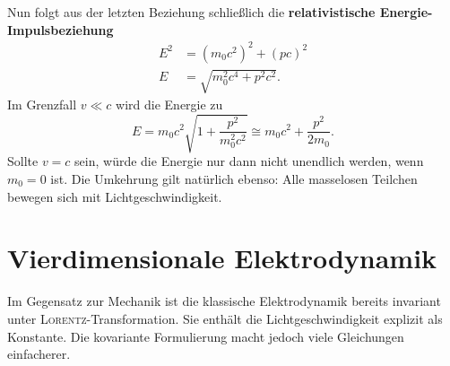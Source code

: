 Nun folgt aus der letzten Beziehung schließlich die \textbf{relativistische Energie-Impulsbeziehung}
\begin{align*}
E^2 &= \left(m_0c^2\right)^2 + \left(p c\right)^2\\
E &= \sqrt{m_0^2c^4 + p^2c^2}.
\end{align*}
Im Grenzfall $v\ll c$ wird die Energie zu
\begin{equation*}
E = m_0c^2\sqrt{1+\frac{p^2}{m_0^2c^2}} \cong m_0c^2 + \frac{p^2}{2m_0}.
\end{equation*}
Sollte $v=c$ sein, würde die Energie nur dann nicht unendlich werden, wenn $m_0=0$ ist. Die Umkehrung gilt natürlich ebenso: Alle masselosen Teilchen bewegen sich mit Lichtgeschwindigkeit.

\section{Vierdimensionale Elektrodynamik}

Im Gegensatz zur Mechanik ist die klassische Elektrodynamik bereits invariant unter \textsc{Lorentz}-Transformation. Sie enthält die Lichtgeschwindigkeit explizit als Konstante. Die kovariante Formulierung macht jedoch viele Gleichungen einfacherer.\\



